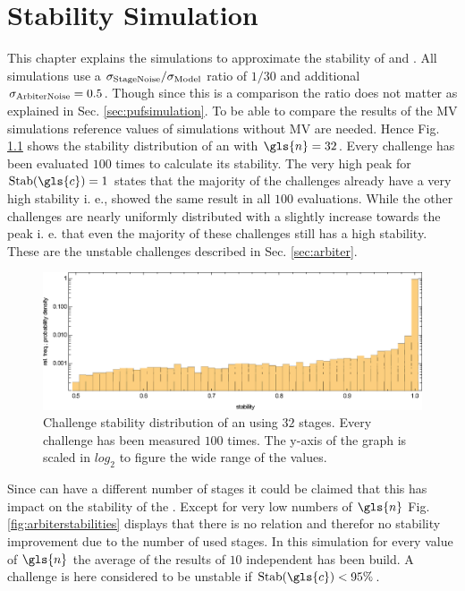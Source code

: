 \chapter{Stability Simulation}
\label{cap:stabilitysimulation}

This chapter explains the simulations to approximate the stability of \mpufs and \mxpufs.
All simulations use a $\sigma_{\mathrm{Stage Noise}}/\sigma_{\mathrm{Model}}$ ratio of $1/30$ and additional $\sigma_{\mathrm{Arbiter Noise}} = 0.5$.
Though since this is a comparison the ratio does not matter as explained in Sec. \ref{sec:pufsimulation}.
To be able to compare the results of the \ac{MV} simulations reference values of \apufs simulations without \ac{MV} are needed.
Hence Fig. \ref{fig:arbiterstabilitydistribution} shows the stability distribution of an \apuf with $\gls{n} = 32$.
Every challenge has been evaluated $100$ times to calculate its stability.
The very high peak for $\Stab(\gls{c}) = 1$ states that the majority of the challenges already have a very high stability i. e., showed the same result in all $100$ evaluations.
While the other challenges are nearly uniformly distributed with a slightly increase towards the peak i. e. that even the majority of these challenges still has a high stability.
These are the unstable challenges described in Sec. \ref{sec:arbiter}.

\begin{figure}[ht]
\includegraphics[width=1.00\textwidth]{images/arbiter-stability-distribution-simulation.eps}
\caption[Challenge stability distribution of an \apuf]{Challenge stability distribution of an \apuf using $32$ stages. Every challenge has been measured $100$ times. The y-axis of the graph is scaled in $log_2$ to figure the wide range of the values.} 
\label{fig:arbiterstabilitydistribution}
\end{figure}

Since \apufs can have a different number of stages it could be claimed that this has impact on the stability of the \puf.
Except for very low numbers of $\gls{n}$ Fig. \ref{fig:arbiterstabilities} displays that there is no relation and therefor no stability improvement due to the number of used stages. %
In this simulation for every value of $\gls{n}$ the average of the results of $10$ independent \apufs has been build.
A challenge is here considered to be unstable if $\Stab(\gls{c}) < 95 \%$.

